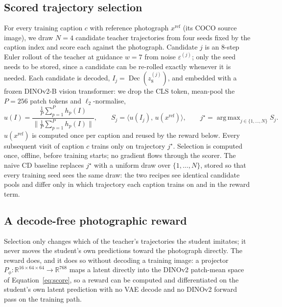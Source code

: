 \documentclass{article} %
\DeclareMathOperator*{\argmaxop}{arg\,max}
\DeclareMathOperator{\Dec}{Dec}
\newcommand{\naive}{naive CD}
\begin{document}
\subsection{Scored trajectory selection}
\label{sec:selection}
For every training caption $c$ with reference photograph $x^{\mathrm{ref}}$ (its COCO source image), we
draw $N=4$ candidate teacher trajectories from four seeds fixed by the caption index and score each against
the photograph. Candidate $j$ is an 8-step Euler rollout of the teacher at guidance $w=7$ from noise
$\varepsilon^{(j)}$; only the seed needs to be stored, since a candidate can be re-rolled exactly whenever it
is needed. Each candidate is decoded, $I_j=\Dec(z^{(j)}_8)$, and embedded with a frozen DINOv2-B vision
transformer: we drop the CLS token, mean-pool the $P{=}256$ patch tokens and $\ell_2$-normalise,
\begin{equation}
u(I)=\frac{\frac1P\sum_{p=1}^{P}h_p(I)}{\big\lVert\frac1P\sum_{p=1}^{P}h_p(I)\big\rVert},\qquad
S_j=\big\langle u(I_j),\,u(x^{\mathrm{ref}})\big\rangle ,\qquad
j^\star=\argmaxop_{j\in\{1,\dots,N\}}S_j .
\label{eq:score}
\end{equation}
$u(x^{\mathrm{ref}})$ is computed once per caption and reused by the reward below. Every subsequent visit
of caption $c$ trains only on trajectory $j^\star$. Selection is computed once, offline, before training
starts; no gradient flows through the scorer. The \naive{} baseline replaces $j^\star$ with a uniform draw
over $\{1,\dots,N\}$, stored so that every training seed sees the same draw: the two recipes see identical
candidate pools and differ only in which trajectory each caption trains on and in the reward term.

\subsection{A decode-free photographic reward}
\label{sec:reward}
Selection only changes which of the teacher's trajectories the student imitates; it never moves the
student's own predictions toward the photograph directly. The reward does, and it does so without decoding a
training image: a projector $P_\phi:\mathbb R^{16\times64\times64}\to\mathbb R^{768}$ maps a latent directly
into the DINOv2 patch-mean space of Equation~\ref{eq:score}, so a reward can be computed and differentiated on
the student's own latent prediction with no VAE decode and no DINOv2 forward pass on the training path.
\end{document}
